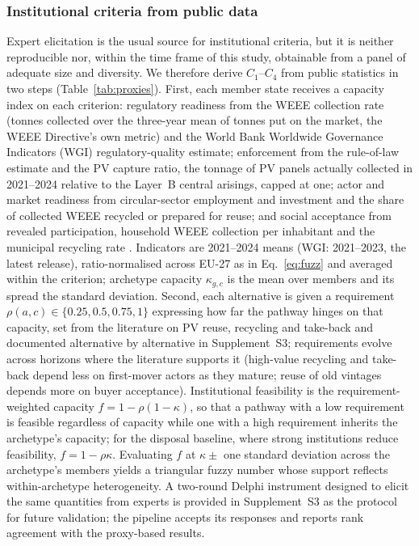 \documentclass[a4paper,fleqn]{cas-sc}
\begin{document}
\subsubsection{Institutional criteria from public data} Expert elicitation is the usual source for institutional criteria, but it is neither reproducible nor, within the time frame of this study, obtainable from a panel of adequate size and diversity. We therefore derive $C_1$--$C_4$ from public statistics in two steps (Table~\ref{tab:proxies}). First, each member state receives a capacity index on each criterion: regulatory readiness from the WEEE collection rate (tonnes collected over the three-year mean of tonnes put on the market, the WEEE Directive's own metric) and the World Bank Worldwide Governance Indicators (WGI) regulatory-quality estimate; enforcement from the rule-of-law estimate and the PV capture ratio, the tonnage of PV panels actually collected in 2021--2024 relative to the Layer~B central arisings, capped at one; actor and market readiness from circular-sector employment and investment and the share of collected WEEE recycled or prepared for reuse; and social acceptance from revealed participation, household WEEE collection per inhabitant and the municipal recycling rate \citep{eurostat_weee,eurostat_cei,wgi2024}. Indicators are 2021--2024 means (WGI: 2021--2023, the latest release), ratio-normalised across EU-27 as in Eq.~\eqref{eq:fuzz} and averaged within the criterion; archetype capacity $\kappa_{g,c}$ is the mean over members and its spread the standard deviation. Second, each alternative is given a requirement $\rho(a,c)\in\{0.25,0.5,0.75,1\}$ expressing how far the pathway hinges on that capacity, set from the literature on PV reuse, recycling and take-back \citep{tsanakas2020,heath2020,deng2019,irena2016} and documented alternative by alternative in Supplement~S3; requirements evolve across horizons where the literature supports it (high-value recycling and take-back depend less on first-mover actors as they mature; reuse of old vintages depends more on buyer acceptance). Institutional feasibility is the requirement-weighted capacity $f=1-\rho(1-\kappa)$, so that a pathway with a low requirement is feasible regardless of capacity while one with a high requirement inherits the archetype's capacity; for the disposal baseline, where strong institutions reduce feasibility, $f=1-\rho\kappa$. Evaluating $f$ at $\kappa\pm$ one standard deviation across the archetype's members yields a triangular fuzzy number whose support reflects within-archetype heterogeneity. A two-round Delphi instrument designed to elicit the same quantities from experts \citep{dalkey1963,ishikawa1993} is provided in Supplement~S3 as the protocol for future validation; the pipeline accepts its responses and reports rank agreement with the proxy-based results.
\end{document}
